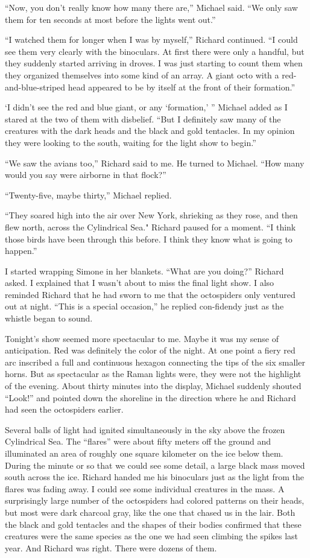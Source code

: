 \documentclass[]{article}
\begin{document}
“Now, you don’t really know how many there are,” Michael said.  “We only saw them for ten seconds at most before the lights went out.”

“I watched them for longer when I was by myself,” Richard continued.  “I could see them very clearly with the binoculars.  At first there were only a handful, but they suddenly started arriving in droves.  I was just starting to count them when they organized themselves into some kind of an array.  A giant octo with a red-and-blue-striped head appeared to be by itself at the front of their formation.”

‘I didn’t see the red and blue giant, or any ‘formation,’ ” Michael added as I stared at the two of them with disbelief.  “But I definitely saw many of the creatures with the dark heads and the black and gold tentacles.  In my opinion they were looking to the south, waiting for the light show to begin.”

“We saw the avians too,” Richard said to me.  He turned to Michael.  “How many would you say were airborne in that flock?”

“Twenty-five, maybe thirty,” Michael replied.

“They soared high into the air over New York, shrieking as they rose, and then flew north, across the Cylindrical Sea."  Richard paused for a moment.  “I think those birds have been through this before.  I think they know what is going to happen.”

I started wrapping Simone in her blankets.  “What are you doing?” Richard asked.  I explained that I wasn’t about to miss the final light show.  I also reminded Richard that he had sworn to me that the octospiders only ventured out at night.  “This is a special occasion,” he replied con-fidendy just as the whistle began to sound.

Tonight’s show seemed more spectacular to me.  Maybe it was my sense of anticipation.  Red was definitely the color of the night.  At one point a fiery red arc inscribed a full and continuous hexagon connecting the tips of the six smaller horns.  But as spectacular as the Raman lights were, they were not the highlight of the evening.  About thirty minutes into the display, Michael suddenly shouted “Look!” and pointed down the shoreline in the direction where he and Richard had seen the octospiders earlier.

Several balls of light had ignited simultaneously in the sky above the frozen Cylindrical Sea.  The “flares” were about fifty meters off the ground and illuminated an area of roughly one square kilometer on the ice below them.  During the minute or so that we could see some detail, a large black mass moved south across the ice.  Richard handed me his binoculars just as the light from the flares was fading away.  I could see some individual creatures in the mass.  A surprisingly large number of the octospiders had colored patterns on their heads, but most were dark charcoal gray, like the one that chased us in the lair.  Both the black and gold tentacles and the shapes of their bodies confirmed that these creatures were the same species as the one we had seen climbing the spikes last year.  And Richard was right.  There were dozens of them.
\end{document}
